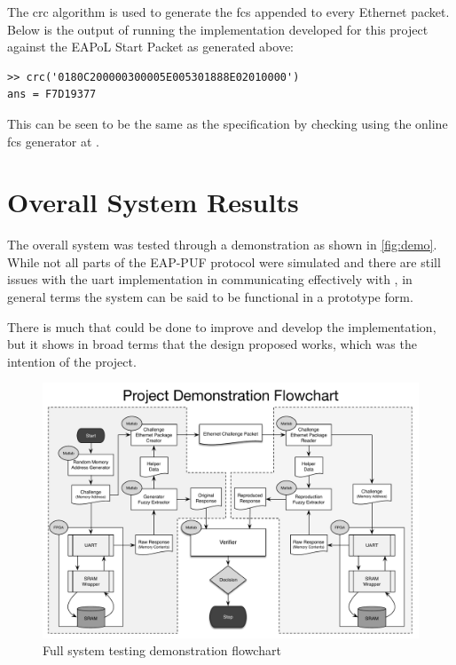 The \gls{crc} algorithm is used to generate the \gls{fcs} appended to every
Ethernet packet. Below is the output of running the \matlab implementation
developed for this project against the EAPoL Start Packet as generated above:

\begin{verbatim}
>> crc('0180C200000300005E005301888E02010000')
ans = F7D19377
\end{verbatim}

This can be seen to be the same as the specification by checking using the online
\gls{fcs} generator at .

\section{Overall System Results}

The overall system was tested through a demonstration as shown in \autoref{fig:demo}.
While not all parts of the EAP-PUF protocol were simulated and there are still
issues with the \gls{uart} implementation in communicating effectively with \matlab,
in general terms the system can be said to be functional in a prototype form.

There is much that could be done to improve and develop the implementation, but
it shows in broad terms that the design proposed works, which was the intention
of the project.

\begin{figure}
  \centering
  \includegraphics[angle=270, scale=0.8]{images/flowchart}
  \caption{Full system testing demonstration flowchart}
  \label{fig:demo}
\end{figure}
